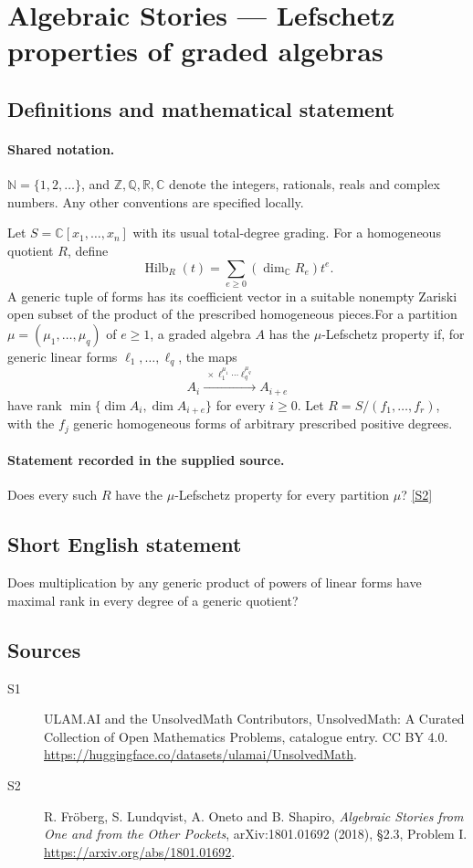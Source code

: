 \documentclass[11pt]{article}
\newcommand{\sref}[2]{\hyperlink{source:#1:#2}{[S#2]}}
\begin{document}
\section{Algebraic Stories — Lefschetz properties of graded algebras}\label{statement}

\subsection{Definitions and mathematical statement}

\paragraph{Shared notation.}$\mathbb N=\{1,2,\ldots\}$, and $\mathbb Z,\mathbb Q,\mathbb R,\mathbb C$ denote the integers, rationals, reals and complex numbers. Any other conventions are specified locally.


Let $S=\mathbb C[x_1,\ldots,x_n]$ with its usual total-degree grading. For a homogeneous quotient $R$, define
\[\operatorname{Hilb}_R(t)=\sum_{e\geq0}(\dim_{\mathbb C}R_e)t^e.
\]
A generic tuple of forms has its coefficient vector in a suitable nonempty Zariski open subset of the product of the prescribed homogeneous pieces.For a partition $\mu=(\mu_1,\ldots,\mu_q)$ of $e\geq1$, a graded algebra $A$ has the $\mu$-Lefschetz property if, for generic linear forms $\ell_1,\ldots,\ell_q$, the maps
\[A_i\xrightarrow{\ \times\ell_1^{\mu_1}\cdots\ell_q^{\mu_q}\ } A_{i+e}
\]
have rank $\min\{\dim A_i,\dim A_{i+e}\}$ for every $i\geq0$. Let $R=S/(f_1,\ldots,f_r)$, with the $f_j$ generic homogeneous forms of arbitrary prescribed positive degrees.
\paragraph{Statement recorded in the supplied source.}
Does every such $R$ have the $\mu$-Lefschetz property for every partition $\mu$? \sref{statement}{2}
\subsection{Short English statement}
Does multiplication by any generic product of powers of linear forms have maximal rank in every degree of a generic quotient?
\subsection{Sources}
\begin{description}
\item[\hypertarget{source:statement:1}{S1}] ULAM.AI and the UnsolvedMath Contributors, UnsolvedMath: A Curated Collection of Open Mathematics Problems, catalogue entry. CC BY 4.0. \url{https://huggingface.co/datasets/ulamai/UnsolvedMath}.
\item[\hypertarget{source:statement:2}{S2}] R. Fröberg, S. Lundqvist, A. Oneto and B. Shapiro, \emph{Algebraic Stories from One and from the Other Pockets}, arXiv:1801.01692 (2018), §2.3, Problem I. \url{https://arxiv.org/abs/1801.01692}.
\end{description}
\label{end:statement}
\end{document}
